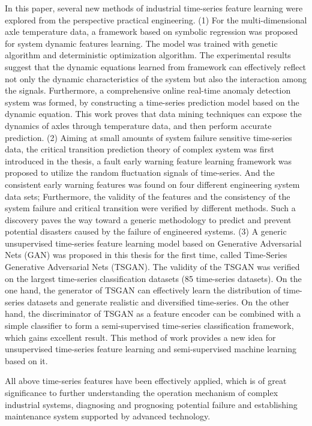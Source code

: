 \begin{eabstract}
In this paper, several new methods of industrial time-series feature learning were explored from the perspective practical engineering. 
(1) For the multi-dimensional axle temperature data, a framework based on symbolic regression was proposed for system dynamic features learning. The model was trained with genetic algorithm and deterministic optimization algorithm. The experimental results suggest that the dynamic equations learned from framework can effectively reflect not only the dynamic characteristics of the system but also the interaction among the signals. Furthermore, a comprehensive online real-time anomaly detection system was formed, by constructing a time-series prediction model based on the dynamic equation. This work proves that data mining techniques can expose the dynamics of axles through temperature data, and then perform accurate prediction.
(2) Aiming at small amounts of system failure sensitive time-series data, the critical transition prediction theory of complex system was first introduced in the thesis, a fault early warning feature learning framework was proposed to utilize the random fluctuation signals of time-series. And the consistent early warning features was found on four different engineering system data sets; Furthermore, the validity of the features and the consistency of the system failure and critical transition were verified by different methods. Such a discovery paves the way toward a generic methodology to predict and prevent potential disasters caused by the failure of engineered systems. 
(3) A generic unsupervised time-series feature learning model based on Generative Adversarial Nets (GAN) was proposed in this thesis for the first time, called Time-Series Generative Adversarial Nets (TSGAN). The validity of the TSGAN was verified on the largest time-series classification datasets (85 time-series datasets). On the one hand, the generator of TSGAN can effectively learn the distribution of time-series datasets and generate realistic and diversified time-series. On the other hand, the discriminator of TSGAN as a feature encoder can be combined with a simple classifier to form a semi-supervised time-series classification framework, which gains excellent result. This method of work provides a new idea for unsupervised time-series feature learning and semi-supervised machine learning based on it.

All above time-series features have been effectively applied, which is of great significance to further understanding the operation mechanism of complex industrial systems, diagnosing and prognosing potential failure and establishing maintenance system supported by advanced technology.
\end{eabstract}

